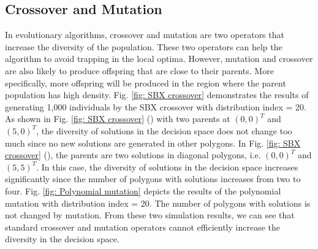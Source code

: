 \documentclass[conference]{IEEEtran}
\begin{document}
\subsection{Crossover and Mutation}
In evolutionary algorithms, crossover and mutation are two operators that increase the diversity of the population. These two operators can help the algorithm to avoid trapping in the local optima. However, mutation and crossover are also likely to produce offspring that are close to their parents. More specifically, more offspring will be produced in the region where the parent population has high density. Fig. \ref{fig: SBX crossover} demonstrates the results of generating 1,000 individuals by the SBX\cite{deb1995simulated} crossover with distribution index = 20. As shown in Fig. \ref{fig: SBX crossover} () with two parents at $(0, 0)^T$ and $(5, 0)^T$, the diversity of solutions in the decision space does not change too much since no new solutions are generated in other polygons. In Fig. \ref{fig: SBX crossover} (), the parents are two solutions in diagonal polygons, i.e. $(0, 0)^T$ and $(5, 5)^T$. In this case, the diversity of solutions in the decision space increases significantly since the number of polygons with solutions increases from two to four. Fig. \ref{fig: Polynomial mutation} depicts the results of the polynomial mutation \cite{deb2014analysing} with distribution index = 20. The number of polygons with solutions is not changed by mutation. From these two simulation results, we can see that standard crossover and mutation operators cannot efficiently increase the diversity in the decision space.
\end{document}
